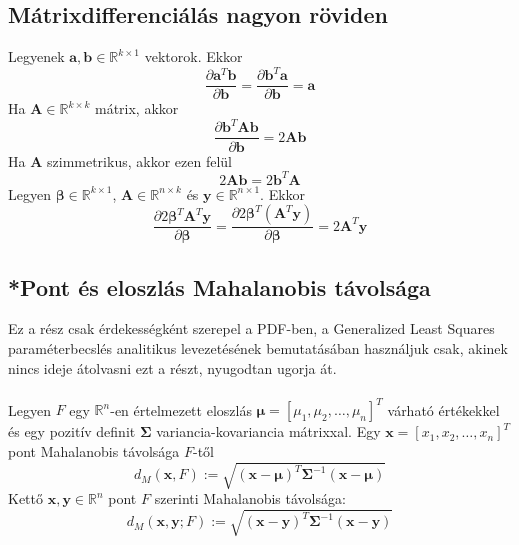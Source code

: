 \documentclass[14p]{report}
\def\pmb{\boldsymbol}
\begin{document}
	\subsection{Mátrixdifferenciálás nagyon röviden}
	Legyenek $\pmb{a}, \pmb{b} \in \mathbb{R}^{k \times 1}$ vektorok. Ekkor
	\[
	\frac{\partial\pmb{a}^T\pmb{b}}{\partial\pmb{b}} = \frac{\partial\pmb{b}^T\pmb{a}}{\partial\pmb{b}} = \pmb{a}
	\]
	Ha $\pmb{A} \in \mathbb{R}^{k \times k}$ mátrix, akkor
	\[
	\frac{\partial\pmb{b}^T\pmb{A}\pmb{b}}{\partial\pmb{b}} = 2\pmb{A}\pmb{b}
	\]
	Ha $\pmb{A}$ szimmetrikus, akkor ezen felül
	\[
	2\pmb{A}\pmb{b} = 2\pmb{b}^T\pmb{A}
	\]
	Legyen $\pmb{\beta} \in \mathbb{R}^{k \times 1}$, $\pmb{A} \in \mathbb{R}^{n \times k}$ és $\pmb{y} \in \mathbb{R}^{n \times 1}$. Ekkor
	\[
	\frac{\partial 2\pmb{\beta}^T\pmb{A}^T\pmb{y}}{\partial\pmb{\beta}} = \frac{\partial 2\pmb{\beta}^T(\pmb{A}^T\pmb{y})}{\partial\pmb{\beta}} = 2\pmb{A}^T\pmb{y}
	\]
	\subsection{*Pont és eloszlás Mahalanobis távolsága}
	Ez a rész csak érdekességként szerepel a PDF-ben, a Generalized Least Squares paraméterbecslés analitikus levezetésének bemutatásában használjuk csak, akinek nincs ideje átolvasni ezt a részt, nyugodtan ugorja át.
	\\
	\\
	Legyen $F$ egy $\mathbb{R}^{n}$-en értelmezett eloszlás $\pmb{\mu} = [\mu_1, \mu_2, \dots, \mu_n]^T$ várható értékekkel és egy pozitív definit $\pmb{\Sigma}$ variancia-kovariancia mátrixxal. Egy $\pmb{x} = [x_1, x_2, \dots, x_n]^T$ pont Mahalanobis távolsága $F$-től
	\[
		d_M(\pmb{x}, F) := \sqrt{(\pmb{x} - \pmb{\mu})^T\pmb{\Sigma}^{-1}(\pmb{x} - \pmb{\mu})}
	\]
	Kettő $\pmb{x}, \pmb{y} \in \mathbb{R}^n$ pont $F$ szerinti Mahalanobis távolsága:
	\[
		d_M(\pmb{x}, \pmb{y}; F) := \sqrt{(\pmb{x} - \pmb{y})^T\pmb{\Sigma}^{-1}(\pmb{x} - \pmb{y})}
	\]
	
\end{document}
